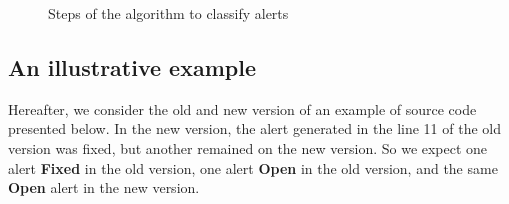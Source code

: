 \documentclass[
]{article}
\begin{document}
\begin{figure}
  \centering
\vspace{5mm}\par
  \caption{Steps of the algorithm to classify alerts}\label{fig:diag}
\end{figure}


\subsection{An illustrative example}\label{source_used}

Hereafter, we consider the old and new version of an example of source code presented 
below. In the new version, the alert generated in the line 11 of the old version was 
fixed, but another remained on the new version. So we expect one alert \textbf{Fixed} 
in the old version, one alert \textbf{Open} in the old version, and the same \textbf{Open}
alert in the new version.


\vspace{16px}
\scriptsize
\end{document}
